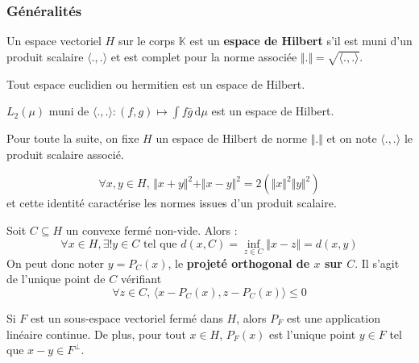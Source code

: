   \subsubsection{Généralités}


  \begin{definition}
    Un espace vectoriel $H$ sur le corps $\mathbb{K}$ est un \textbf{espace de Hilbert} s'il est muni d'un produit scalaire $\langle . , . \rangle$ et est complet pour la norme associée $\Vert . \Vert = \sqrt{\langle . , . \rangle}$.
  \end{definition}

  \begin{example}
    Tout espace euclidien ou hermitien est un espace de Hilbert.
  \end{example}

  \begin{example}
    $L_2(\mu)$ muni de $\langle . , . \rangle : (f,g) \mapsto \int f \overline{g} \, \mathrm{d}\mu$ est un espace de Hilbert.
  \end{example}

  Pour toute la suite, on fixe $H$ un espace de Hilbert de norme $\Vert . \Vert$ et on note $\langle ., . \rangle$ le produit scalaire associé.

  \begin{lemma}
    \[ \forall x, y \in H, \, \Vert x + y \Vert^2 + \Vert x - y \Vert^2 = 2(\Vert x \Vert^2 \Vert y \Vert^2) \]
    et cette identité caractérise les normes issues d'un produit scalaire.
  \end{lemma}


  \begin{theorem}
    Soit $C \subseteq H$ un convexe fermé non-vide. Alors :
    \[ \forall x \in H, \exists! y \in C \text{ tel que } d(x, C) = \inf_{z \in C} \Vert x - z \Vert = d(x, y) \]
    On peut donc noter $y = P_C(x)$, le \textbf{projeté orthogonal de $x$ sur $C$}. Il s'agit de l'unique point de $C$ vérifiant
    \[ \forall z \in C, \, \langle x - P_C(x), z - P_C(x) \rangle \leq 0 \]
  \end{theorem}

  \begin{theorem}
    Si $F$ est un sous-espace vectoriel fermé dans $H$, alors $P_F$ est une application linéaire continue. De plus, pour tout $x \in H$, $P_F(x)$ est l'unique point $y \in F$ tel que $x-y \in F^\perp$.
  \end{theorem}

